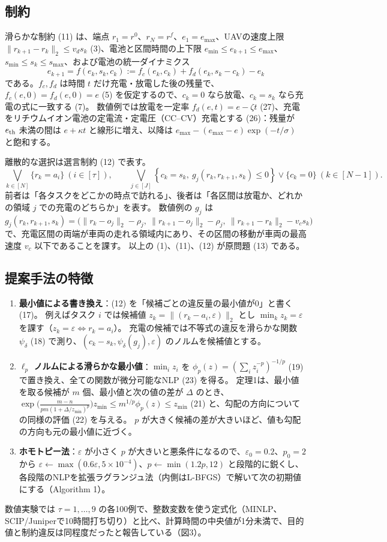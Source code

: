 \documentclass[uplatex,dvipdfmx,a4paper,11pt,jafont=haranoaji]{bxjsarticle}
\newcommand{\answerpart}[1]{\par\Needspace{6\baselineskip}\subsection*{#1}}
\newcommand{\norm}[1]{\lVert #1\rVert_2}
\begin{document}
\answerpart{制約}
滑らかな制約 (11) は、端点 $r_1=r^0$、$r_N=r^f$、$e_1=e_{\max}$、UAVの速度上限 $\norm{r_{k+1}-r_k}\le v_ds_k$ (3)、電池と区間時間の上下限 $e_{\min}\le e_{k+1}\le e_{\max}$、$s_{\min}\le s_k\le s_{\max}$、および電池の統一ダイナミクス
\begin{equation*}
  e_{k+1}=f(e_k,s_k,c_k):=f_c(e_k,c_k)+f_d(e_k,s_k-c_k)-e_k \tag{6}
\end{equation*}
である。$f_c,f_d$ は時間 $t$ だけ充電・放電した後の残量で、$f_c(e,0)=f_d(e,0)=e$ (5) を仮定するので、$c_k=0$ なら放電、$c_k=s_k$ なら充電の式に一致する (7)。
数値例では放電を一定率 $f_d(e,t)=e-\zeta t$ (27)、充電をリチウムイオン電池の定電流・定電圧（CC–CV）充電とする (26)：残量が $e_{\rm th}$ 未満の間は $e+\kappa t$ と線形に増え、以降は $e_{\max}-(e_{\max}-e)\exp(-t/\sigma)$ と飽和する。

離散的な選択は選言制約 (12) で表す。
\begin{equation*}
  \bigvee_{k\in[N]}\{r_k=a_i\}\ (i\in[\tau]),\qquad
  \bigvee_{j\in[J]}\left\{c_k=s_k,\ g_j(r_k,r_{k+1},s_k)\le0\right\}\vee\{c_k=0\}\ (k\in[N-1]). \tag{12}
\end{equation*}
前者は「各タスクをどこかの時点で訪れる」、後者は「各区間は放電か、どれかの領域 $j$ での充電のどちらか」を表す。
数値例の $g_j$ は
\begin{equation*}
  g_j(r_k,r_{k+1},s_k)=\bigl(\norm{r_k-o_j}-\rho_j,\ \norm{r_{k+1}-o_j}-\rho_j,\ \norm{r_{k+1}-r_k}-v_cs_k\bigr) \tag{24}
\end{equation*}
で、充電区間の両端が車両の走れる領域内にあり、その区間の移動が車両の最高速度 $v_c$ 以下であることを課す。
以上の (1)、(11)、(12) が原問題 (13) である。

\answerpart{提案手法の特徴}
\begin{enumerate}
  \item \textbf{最小値による書き換え}：(12) を「候補ごとの違反量の最小値が0」と書く (17)。
  例えばタスク $i$ では候補値 $z_k=\norm{(r_k-a_i,\varepsilon)}$ とし $\min_kz_k=\varepsilon$ を課す（$z_k=\varepsilon\iff r_k=a_i$）。
  充電の候補では不等式の違反を滑らかな関数 $\psi_\delta$ (18) で測り、$(c_k-s_k,\psi_\delta(g_j),\varepsilon)$ のノルムを候補値とする。
  \item \textbf{$\ell_p$ ノルムによる滑らかな最小値}：$\min_iz_i$ を $\phi_p(z)=(\sum_iz_i^{-p})^{-1/p}$ (19) で置き換え、全ての関数が微分可能なNLP (23) を得る。
  定理1は、最小値を取る候補が $m$ 個、最小値と次の値の差が $\Delta$ のとき、
  $\exp\!\bigl(\frac{m-n}{pm(1+\Delta/z_{\min})^p}\bigr)z_{\min}\le m^{1/p}\phi_p(z)\le z_{\min}$ (21) と、勾配の方向についての同様の評価 (22) を与える。
  $p$ が大きく候補の差が大きいほど、値も勾配の方向も元の最小値に近づく。
  \item \textbf{ホモトピー法}：$\varepsilon$ が小さく $p$ が大きいと悪条件になるので、$\varepsilon_0=0.2$、$p_0=2$ から $\varepsilon\leftarrow\max(0.6\varepsilon,5\times10^{-4})$、$p\leftarrow\min(1.2p,12)$ と段階的に鋭くし、各段階のNLPを拡張ラグランジュ法（内側はL-BFGS）で解いて次の初期値にする（Algorithm 1）。
\end{enumerate}
数値実験では $\tau=1,\dots,9$ の各100例で、整数変数を使う定式化（MINLP、SCIP/Juniperで10時間打ち切り）と比べ、計算時間の中央値が1分未満で、目的値と制約違反は同程度だったと報告している（図3）。
\end{document}

